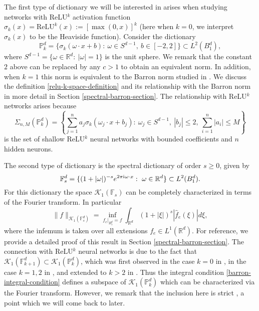 The first type of dictionary we will be interested in arises when studying networks with ReLU$^k$ activation function $\sigma_k(x) = \text{ReLU}^k(x) := [\max(0,x)]^k$ (here when $k=0$, we interpret $\sigma_k(x)$ to be the Heaviside function). Consider the dictionary
\begin{equation}\label{relu-k-space-definition}
 \mathbb{P}^d_k = \{\sigma_k(\omega\cdot x + b):~\omega\in S^{d-1},~b\in [-2,2]\}\subset L^2(B_1^d),
\end{equation}
where $S^{d-1} = \{\omega\in \mathbb{R}^d:~|\omega| = 1\}$ is the unit sphere. We remark that the constant $2$ above can be replaced by any $c > 1$ to obtain an equivalent norm. In addition, when $k=1$ this norm is equivalent to the Barron norm studied in \cite{ma2019barron,ma2019priori}. We discuss the definition \eqref{relu-k-space-definition} and its relationship with the Barron norm in more detail in Section \ref{spectral-barron-section}. The relationship with ReLU$^k$ networks arises because
\begin{equation}
 \Sigma_{n,M}(\mathbb{P}^d_k) = \left\{\sum_{j=1}^n a_j\sigma_k(\omega_j \cdot x + b_j):~\omega_j\in S^{d-1},~|b_j| \leq 2,~\sum_{i=1}^n|a_i|\leq M\right\}
\end{equation}
is the set of shallow ReLU$^k$ neural networks with bounded coefficients and $n$ hidden neurons.

The second type of dictionary is the spectral dictionary of order $s \geq 0$, given by
\begin{equation}
 \mathbb{F}^d_s = \{(1+|\omega|)^{-s}e^{2\pi {\mathrm{i}\mkern1mu} \omega\cdot x}:~\omega\in \mathbb{R}^d\}\subset L^2(B_1^d).
\end{equation}
For this dictionary the space $\mathcal{K}_1(\mathbb{F}_s)$ can be completely characterized in terms of the Fourier transform. In particular
\begin{equation}\label{barron-integral-condition}
 \|f\|_{\mathcal{K}_1(\mathbb{F}^d_s)} = \inf_{f_e|_{B_1^d}= f} \int_{\mathbb{R}^d} (1+|\xi|)^s|\hat{f}_e(\xi)|d\xi,
\end{equation}
where the infemum is taken over all extensions $f_e\in L^1(\mathbb{R}^d)$. For reference, we provide a detailed proof of this result in Section \ref{spectral-barron-section}. The connection with ReLU$^k$ neural networks is due to the fact that $\mathcal{K}_1(\mathbb{F}^d_{k+1})\subset \mathcal{K}_1(\mathbb{P}^d_k)$, which was first observed in the case $k=0$ in \cite{barron1993universal}, in the case $k=1,2$ in \cite{klusowski2018approximation}, and extended to $k > 2$ in \cite{CiCP-28-1707}. Thus the integral condition \eqref{barron-integral-condition} defines a subspace of $\mathcal{K}_1(\mathbb{P}^d_k)$ which can be characterized via the Fourier transform. However, we remark that the inclusion here is strict \cite{wojtowytsch2020representation}, a point which we will come back to later.

